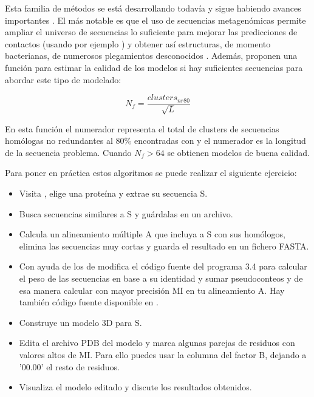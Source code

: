 Esta familia de m\'{e}todos  se est\'{a} desarrollando todav\'{i}a y sigue habiendo avances importantes \citep{Buchan2017}.
El m\'{a}s notable es que el uso de secuencias metagen\'{o}micas permite ampliar el universo de secuencias lo suficiente 
para mejorar las predicciones de contactos (usando por ejemplo ) 
y obtener as\'{i} estructuras, de momento bacterianas, de numerosos plegamientos desconocidos \citep{Ovchinnikov2017}. 
Adem\'{a}s, \citet{Ovchinnikov2017} proponen una funci\'{o}n para estimar la calidad de los modelos si hay suficientes secuencias para abordar
este tipo de modelado:

\begin{equation}
N_{f} = \frac{clusters_{nr80}}{\sqrt L} 
\end{equation} 

En esta funci\'{o}n el numerador representa el total de clusters de secuencias hom\'{o}logas no redundantes al 80\% 
encontradas con  y el numerador es la longitud de la secuencia problema. 
Cuando $N_{f} > 64$ se obtienen modelos de buena calidad. 
 
Para poner en pr\'{a}ctica estos algoritmos se puede realizar el siguiente ejercicio:

\begin{itemize}

\item Visita , elige una prote\'{i}na y extrae su secuencia S.

\item Busca secuencias similares a S y gu\'{a}rdalas en un archivo.

\item Calcula un alineamiento m\'{u}ltiple A que incluya a S con sus hom\'{o}logos, elimina las secuencias muy cortas y 
guarda el resultado en un fichero FASTA.

\item Con ayuda de los 
 de \cite{Marks2011}
modifica el c\'{o}digo fuente del programa 3.4 para calcular el peso de las secuencias en base a su identidad
y sumar pseudoconteos y de esa manera calcular con mayor precisi\'{o}n MI en tu alineamiento A.
Hay tambi\'{e}n c\'{o}digo fuente disponible en 
.

\item Construye un modelo 3D para S.

\item Edita el archivo PDB del modelo y marca algunas parejas de residuos con valores altos de MI. Para ello puedes usar la columna del factor B,
dejando a '00.00' el resto de residuos. 

\item Visualiza el modelo editado y discute los resultados obtenidos.

\end{itemize}



